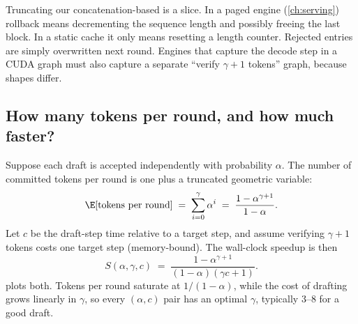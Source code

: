 \begin{pitfall}
Truncating our concatenation-based  is a slice. In a paged engine
(\cref{ch:serving}) rollback means decrementing the sequence length and possibly freeing
the last block. In a static cache it only means resetting a length counter. Rejected
entries are simply overwritten next round. Engines that capture the decode step in a CUDA
graph must also capture a separate ``verify $\gamma+1$ tokens'' graph, because shapes
differ.
\end{pitfall}

\subsection{How many tokens per round, and how much faster?}
Suppose each draft is accepted independently with probability $\alpha$. The number of
committed tokens per round is one plus a truncated geometric variable:
\begin{equation}
  \E[\text{tokens per round}] \;=\; \sum_{i=0}^{\gamma}\alpha^i \;=\;
  \frac{1-\alpha^{\gamma+1}}{1-\alpha}.
  \label{eq:efficient:tpr}
\end{equation}
Let $c$ be the draft-step time relative to a target step, and assume verifying $\gamma+1$
tokens costs one target step (memory-bound). The wall-clock speedup is then
\begin{equation}
  S(\alpha,\gamma,c) \;=\; \frac{1-\alpha^{\gamma+1}}{(1-\alpha)(\gamma c + 1)} .
  \label{eq:efficient:speedup}
\end{equation}
 plots both. Tokens per round saturate at
$1/(1-\alpha)$, while the cost of drafting grows linearly in $\gamma$, so every
$(\alpha,c)$ pair has an optimal $\gamma$, typically 3--8 for a good draft.

